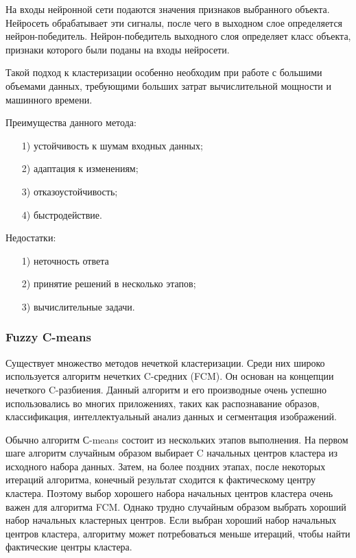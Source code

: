 На входы нейронной сети подаются значения признаков выбранного объекта. Нейросеть обрабатывает эти сигналы, после чего в выходном слое определяется нейрон-победитель. Нейрон-победитель выходного слоя определяет класс объекта, признаки которого были поданы на входы нейросети.

Такой подход к кластеризации особенно необходим при работе с большими объемами данных, требующими больших затрат вычислительной мощности и машинного времени.

Преимущества данного метода:
\begin{enumerate}
	\item[1)] устойчивость к шумам входных данных;
	\item[2)] адаптация к изменениям;
	\item[3)] отказоустойчивость;
	\item[4)] быстродействие.
\end{enumerate}

Недостатки:
\begin{enumerate}
	\item[1)] неточность ответа
	\item[2)] принятие решений в несколько этапов;
	\item[3)] вычислительные задачи.
\end{enumerate}

\subsubsection{Fuzzy C-means}
Существует множество методов нечеткой кластеризации. Среди них широко используется алгоритм нечетких C-средних (FCM). Он основан на концепции нечеткого C-разбиения. Данный алгоритм и его производные очень успешно использовались во многих приложениях, таких как распознавание образов, классификация, интеллектуальный анализ данных и сегментация изображений.

Обычно алгоритм С-means состоит из нескольких этапов выполнения. На первом шаге алгоритм случайным образом выбирает C начальных центров кластера из исходного набора данных. Затем, на более поздних этапах, после некоторых итераций алгоритма, конечный результат сходится к фактическому центру кластера. Поэтому выбор хорошего набора начальных центров кластера очень важен для алгоритма FCM. Однако трудно случайным образом выбрать хороший набор начальных кластерных центров. Если выбран хороший набор начальных центров кластера, алгоритму может потребоваться меньше итераций, чтобы найти фактические центры кластера.

